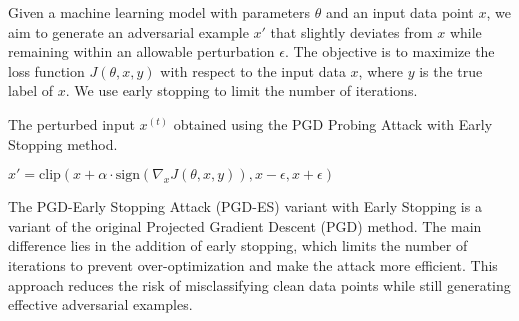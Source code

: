 Given a machine learning model with parameters $\theta$ and an input data point $x$, we aim to generate an adversarial example $x'$ that slightly deviates from $x$ while remaining within an allowable perturbation $\epsilon$. The objective is to maximize the loss function $J(\theta, x, y)$ with respect to the input data $x$, where $y$ is the true label of $x$. We use early stopping to limit the number of iterations.

The perturbed input $x^{(t)}$ obtained using the PGD Probing Attack with Early Stopping method.

$x' = \text{clip}(x + \alpha \cdot \text{sign}(\nabla_x J(\theta, x, y)), x - \epsilon, x + \epsilon)$

The PGD-Early Stopping Attack (PGD-ES) variant with Early Stopping is a variant of the original Projected Gradient Descent (PGD) method. The main difference lies in the addition of early stopping, which limits the number of iterations to prevent over-optimization and make the attack more efficient. This approach reduces the risk of misclassifying clean data points while still generating effective adversarial examples.